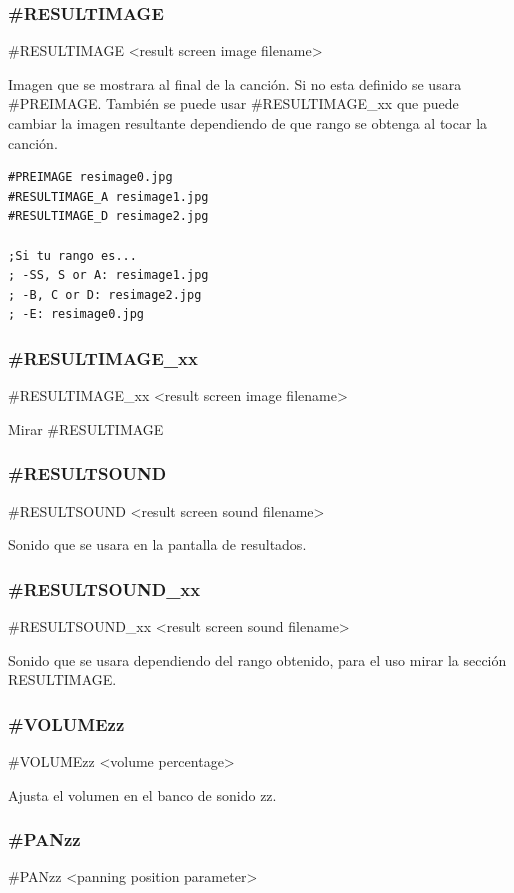 \documentclass[a4paper,11pt,oneside]{book}
\begin{document}
\subsubsection{\#RESULTIMAGE}
\#RESULTIMAGE <result screen image filename>

Imagen que se mostrara al final de la canción.
Si no esta definido se usara \#PREIMAGE.
También se puede usar \#RESULTIMAGE\_xx que puede cambiar la imagen resultante dependiendo de que rango se obtenga al tocar la canción.

\begin{Verbatim}[frame=single]
#PREIMAGE resimage0.jpg
#RESULTIMAGE_A resimage1.jpg
#RESULTIMAGE_D resimage2.jpg

;Si tu rango es...
; -SS, S or A: resimage1.jpg 
; -B, C or D: resimage2.jpg 
; -E: resimage0.jpg 

\end{Verbatim}


\subsubsection{\#RESULTIMAGE\_xx}
\#RESULTIMAGE\_xx <result screen image filename>

Mirar \#RESULTIMAGE

\subsubsection{\#RESULTSOUND}
\#RESULTSOUND <result screen sound filename>

Sonido que se usara en la pantalla de resultados.


\subsubsection{\#RESULTSOUND\_xx}
\#RESULTSOUND\_xx <result screen sound filename>

Sonido que se usara dependiendo del rango obtenido, para el uso mirar la sección RESULTIMAGE.


\subsubsection{\#VOLUMEzz}
\#VOLUMEzz <volume percentage>

Ajusta el volumen en el banco de sonido zz.

\subsubsection{\#PANzz}
\#PANzz <panning position parameter>
\end{document}
